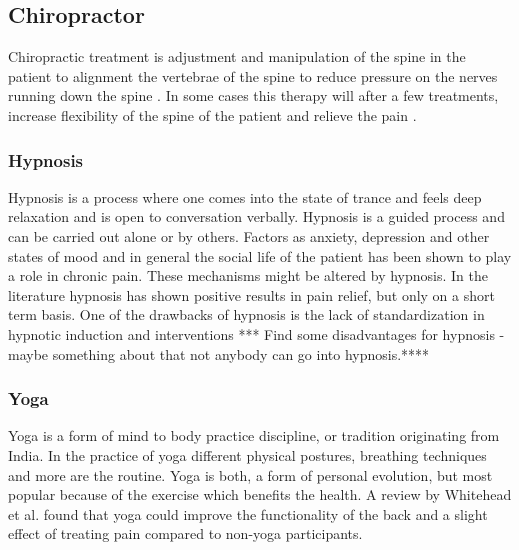 \subsection{Chiropractor}
Chiropractic treatment is adjustment and manipulation of the spine in the patient to alignment the vertebrae of the spine to reduce pressure on the nerves running down the spine \cite{Gerald2013}. In some cases this therapy will after a few treatments, increase flexibility of the spine of the patient and relieve the pain \cite{Peterson2012}.

\subsubsection{Hypnosis}
Hypnosis is a process where one comes into the state of trance and feels deep relaxation and is open to conversation verbally. Hypnosis is a guided process and can be carried out alone or by others. \cite{Gerald2013} Factors as anxiety, depression and other states of mood and in general the social life of the patient has been shown to play a role in chronic pain. These mechanisms might be altered by hypnosis.
In the literature hypnosis has shown positive results in pain relief, but only on a short term basis. \cite{Dhanani2011}
 One of the drawbacks of hypnosis is the lack of standardization in hypnotic induction and interventions \cite{Alkis2010}
*** Find some disadvantages for hypnosis - maybe something about that not anybody can go into hypnosis.****

\subsubsection{Yoga}
Yoga is a form of mind to body practice discipline, or tradition originating from India. In the practice of yoga different physical postures, breathing techniques and more are the routine. 
Yoga is both, a form of personal evolution, but most popular because of the exercise which benefits the health.
A review by Whitehead et al. \cite{Whitehead2017} found that yoga could improve the functionality of the back and a slight effect of treating pain compared to non-yoga participants. 


